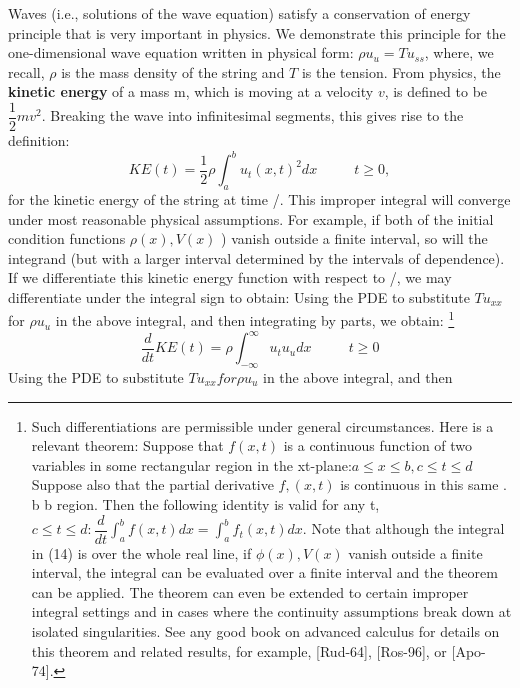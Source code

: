 \documentclass[../main.tex]{subfiles}
\begin{document}
{{\begin{figure}[H]
	\label{pfig:ch12_10}
\end{figure}
Waves (i.e., solutions of the wave equation) satisfy a conservation of energy 
principle that is very important in physics. We demonstrate this principle for the 
one-dimensional wave equation written in physical form: $\rho u_u = Tu_{ss}$, where, we recall, $ \rho $ is the mass density of the string and $T$ is the tension. From physics, the 
\textbf{kinetic energy} of a mass m, which is moving at a velocity $v$, is defined to be $\dfrac{1}{2}mv^2$. Breaking the wave into infinitesimal segments, this gives rise to the 
definition: 
\begin{equation}
KE(t)=\dfrac{1}{2} \rho \int_a^b u_t (x,t)^2 dx ~~~~~~~~~~~~ t\geq 0, 
\end{equation}
for the kinetic energy of the string at time /. This improper integral will converge 
under most reasonable physical assumptions. For example, if both of the initial 
condition functions  $ \rho (x), V(x)$ ) vanish outside a finite interval, so will the 
integrand (but with a larger interval determined by the intervals of dependence). If we differentiate this kinetic energy function with respect to /, we may differentiate 
under the integral sign to obtain: 
Using the PDE to substitute $ Tu_{xx}$for $\rho u_u$ in the above integral, and then 
integrating by parts, we obtain: 
\footnote{ Such differentiations are permissible under general circumstances. Here is a relevant theorem: 
Suppose that $f(x,t)$ is a continuous function of two variables in some rectangular region in the xt-plane:$a\leqslant x\leqslant b, c\leqslant t \leqslant d$ Suppose also that the partial derivative $f,(x,t)$ is continuous in this same 
. b b region. Then the following identity is valid for any t, $c\leqslant t \leqslant d : \dfrac{d}{dt} \int_{a}^{b} f(x,t)dx=\int_{a}^{b} f_t (x,t) dx$. Note that 
although the integral in (14) is over the whole real line, if $\phi(x), V(x)$ vanish outside a finite interval, 
the integral can be evaluated over a finite interval and the theorem can be applied. The theorem can 
even be extended to certain improper integral settings and in cases where the continuity assumptions 
break down at isolated singularities. See any good book on advanced calculus for details on this 
theorem and related results, for example, [Rud-64], [Ros-96], or [Apo-74]. } 
\begin{equation}
\frac{d}{dt} KE(t)=\rho \int_{-\infty}^{\infty} u_t u_u dx ~~~~~~~~~~~~ t\geq 0
\end{equation}
Using the PDE to substitute $Tu_{xx} for \rho u_u$ in the above integral, and then 
}}
\end{document}
